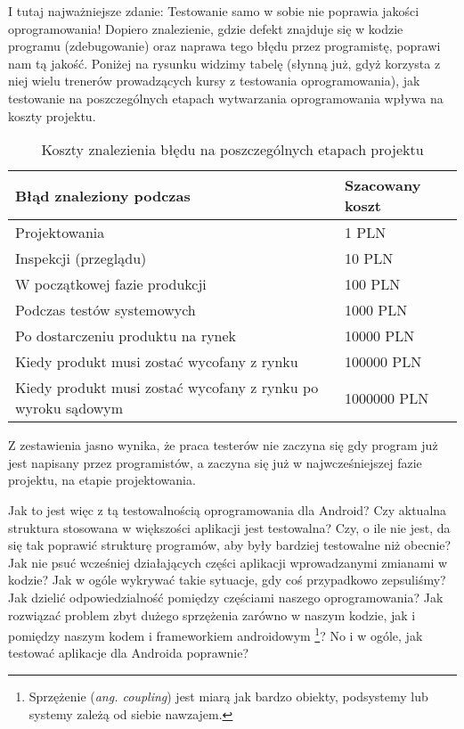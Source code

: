I tutaj najważniejsze zdanie: Testowanie samo w sobie nie poprawia jakości oprogramowania! Dopiero znalezienie, gdzie defekt znajduje się w kodzie programu (zdebugowanie) oraz naprawa tego błędu przez programistę, poprawi nam tą jakość. Poniżej na rysunku widzimy tabelę (słynną już, gdyż korzysta z niej wielu trenerów prowadzących kursy z testowania oprogramowania), jak testowanie na poszczególnych etapach wytwarzania oprogramowania wpływa na koszty projektu.

\begin{table}[]
\centering
\caption{Koszty znalezienia błędu na poszczególnych etapach projektu}
\label{tab:sample_table}
\begin{tabular}{|l|l|}
\hline
\textbf{Błąd znaleziony podczas} & \textbf{Szacowany koszt} \\ \hline
Projektowania & 1 PLN	\\ \hline
Inspekcji (przeglądu) & 10 PLN	\\ \hline
W początkowej fazie produkcji & 100 PLN	\\ \hline
Podczas testów systemowych & 1000 PLN	\\ \hline
Po dostarczeniu produktu na rynek & 10000 PLN	\\ \hline
Kiedy produkt musi zostać wycofany z rynku & 100000 PLN	\\ \hline
Kiedy produkt musi zostać wycofany z rynku po wyroku sądowym & 1000000 PLN	\\ \hline
\end{tabular}
\end{table}

Z zestawienia jasno wynika, że praca testerów nie zaczyna się gdy program już jest napisany przez programistów, a zaczyna się już w najwcześniejszej fazie projektu, na etapie projektowania.

Jak to jest więc z tą testowalnością oprogramowania dla Android? Czy aktualna struktura stosowana w większości aplikacji jest testowalna? Czy, o ile nie jest, da się tak poprawić strukturę programów, aby były bardziej testowalne niż obecnie? Jak nie psuć wcześniej działających części aplikacji wprowadzanymi zmianami w kodzie? Jak w ogóle wykrywać takie sytuacje, gdy coś przypadkowo zepsuliśmy? Jak dzielić odpowiedzialność pomiędzy częściami naszego oprogramowania? Jak rozwiązać problem zbyt dużego sprzężenia zarówno w naszym kodzie, jak i pomiędzy naszym kodem i frameworkiem androidowym \footnote{Sprzężenie (\textit{ang. coupling}) jest miarą jak bardzo obiekty, podsystemy lub systemy zależą od siebie nawzajem.}? No i w ogóle, jak testować aplikacje dla Androida poprawnie?

